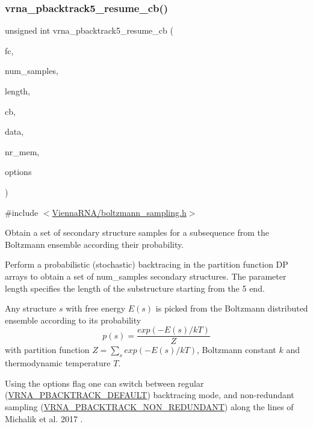 \subsubsection{\texorpdfstring{vrna\_pbacktrack5\_resume\_cb()}{vrna\_pbacktrack5\_resume\_cb()}}
{\footnotesize\ttfamily unsigned int vrna\+\_\+pbacktrack5\+\_\+resume\+\_\+cb (\begin{DoxyParamCaption}\item[{\mbox{\hyperlink{group__fold__compound_ga1b0cef17fd40466cef5968eaeeff6166}{vrna\+\_\+fold\+\_\+compound\+\_\+t}} $\ast$}]{fc,  }\item[{unsigned int}]{num\+\_\+samples,  }\item[{unsigned int}]{length,  }\item[{\mbox{\hyperlink{group__subopt__stochbt_gad5bd9c8b195dd9cde15389f0042f0e44}{vrna\+\_\+boltzmann\+\_\+sampling\+\_\+callback}} $\ast$}]{cb,  }\item[{void $\ast$}]{data,  }\item[{\mbox{\hyperlink{group__subopt__stochbt_gaa59c30efbed96bf9aaf8005584c72e63}{vrna\+\_\+pbacktrack\+\_\+mem\+\_\+t}} $\ast$}]{nr\+\_\+mem,  }\item[{unsigned int}]{options }\end{DoxyParamCaption})}



{\ttfamily \#include $<$\mbox{\hyperlink{boltzmann__sampling_8h}{Vienna\+R\+N\+A/boltzmann\+\_\+sampling.\+h}}$>$}



Obtain a set of secondary structure samples for a subsequence from the Boltzmann ensemble according their probability. 

Perform a probabilistic (stochastic) backtracing in the partition function DP arrays to obtain a set of {\ttfamily num\+\_\+samples} secondary structures. The parameter {\ttfamily length} specifies the length of the substructure starting from the 5\textquotesingle{} end.

Any structure $ s $ with free energy $ E(s) $ is picked from the Boltzmann distributed ensemble according to its probability \[ p(s) = \frac{exp(-E(s) / kT)}{Z} \] with partition function $ Z = \sum_s exp(-E(s) / kT) $, Boltzmann constant $ k $ and thermodynamic temperature $ T $.

Using the {\ttfamily options} flag one can switch between regular (\mbox{\hyperlink{group__subopt__stochbt_ga760aa2fb2d5e3d7521a11454a21e9b9f}{V\+R\+N\+A\+\_\+\+P\+B\+A\+C\+K\+T\+R\+A\+C\+K\+\_\+\+D\+E\+F\+A\+U\+LT}}) backtracing mode, and non-\/redundant sampling (\mbox{\hyperlink{group__subopt__stochbt_ga9d580ce645aa0c38b69afdf56c332200}{V\+R\+N\+A\+\_\+\+P\+B\+A\+C\+K\+T\+R\+A\+C\+K\+\_\+\+N\+O\+N\+\_\+\+R\+E\+D\+U\+N\+D\+A\+NT}}) along the lines of Michalik et al. 2017 \cite{michalik:2017}.

